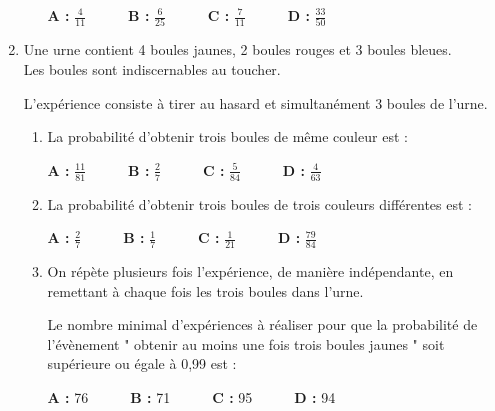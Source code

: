 \begin{enumerate}
\begin{enumerate}
\par
          \textbf{A :} $\frac{4}{11}$$ \quad  \quad  \quad $\textbf{B :} $\frac{6}{25}$$ \quad  \quad  \quad $\textbf{C :} $\frac{7}{11}$$ \quad  \quad  \quad $\textbf{D :} $\frac{33}{50}$
     \end{enumerate}
     \item
     Une urne contient 4 boules jaunes, 2 boules rouges et 3 boules bleues.
\\
     Les boules sont indiscernables au toucher.
     \par
     L'expérience consiste à tirer au hasard et simultanément 3 boules de l'urne. \begin{enumerate}
          \item
          La probabilité d'obtenir trois boules de même couleur est :
\par
          \textbf{A :} $\frac{11}{81}$$ \quad  \quad  \quad $\textbf{B :} $\frac{2}{7}$$ \quad  \quad  \quad $\textbf{C :} $\frac{5}{84}$$ \quad  \quad  \quad $\textbf{D :} $\frac{4}{63}$
          \item
          La probabilité d'obtenir trois boules de trois couleurs différentes est :
\par
          \textbf{A :} $\frac{2}{7}$$ \quad  \quad  \quad $\textbf{B :} $\frac{1}{7}$$ \quad  \quad  \quad $\textbf{C :} $\frac{1}{21}$$ \quad  \quad  \quad $\textbf{D :} $\frac{79}{84}$
          \item
          On répète plusieurs fois l'expérience, de manière indépendante, en remettant à chaque fois les trois boules dans l'urne.
          \par
          Le nombre minimal d'expériences à réaliser pour que la probabilité de l'évènement " obtenir au moins une fois trois boules jaunes " soit supérieure ou égale à 0,99 est :
\par
          \textbf{A :} 76$ \quad  \quad  \quad $\textbf{B :} 71$ \quad  \quad  \quad $\textbf{C :} 95$ \quad  \quad  \quad $\textbf{D :} 94
     \end{enumerate}
\end{enumerate}

